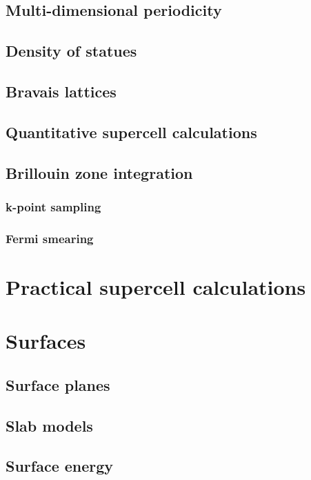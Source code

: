 \documentclass[11pt]{article}
\begin{document}
\subsection{Multi-dimensional periodicity}
\label{sec:orgffb94d4}
\subsection{Density of statues}
\label{sec:org930b956}
\subsection{Bravais lattices}
\label{sec:org54f54dd}
\subsection{Quantitative supercell calculations}
\label{sec:orgaabdfa6}
\subsection{Brillouin zone integration}
\label{sec:orgbf48ce6}
\subsubsection{k-point sampling}
\label{sec:org3ff327c}
\subsubsection{Fermi smearing}
\label{sec:org82f2d34}
\newpage
\section{Practical supercell calculations}
\label{sec:orgf06c6f7}
\newpage
\section{Surfaces}
\label{sec:orgeda3577}
\subsection{Surface planes}
\label{sec:org4380f43}
\subsection{Slab models}
\label{sec:orgb0675b1}
\subsection{Surface energy}
\label{sec:orgcb74d0f}
\end{document}
